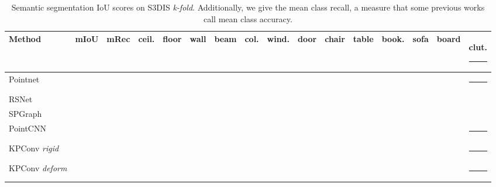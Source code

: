 \documentclass[10pt,twocolumn,letterpaper]{article}
\newcommand\Tstrut{\rule{-3pt}{2.6ex}}       \newcommand\Bstrut{\rule[-0.9ex]{-3pt}{0pt}} \newcommand{\TBstrut}{\rule{-3pt}{2.6ex} \rule[-0.9ex]{-2pt}{0pt}}
\begin{document}
\begin{table*}[t]
\setlength\tabcolsep{0.5pt}
\begin{small}
\begin{center}
\begin{tabular}{L{2.4cm} | C{1.0cm} | C{1.0cm} | *{13}{C{0.9cm}}}
Method	 & mIoU & mRec & ceil.	 & floor	 & wall	 & beam	 & col.	 & wind.	 & door	 & chair	 & table	 & book.	 & sofa	 & board & clut.	\Bstrut\\
\hline
Pointnet \cite{qi2017pointnet}	& 	& 	& 	& 	& 	& 	& 	& 	& 	& 	& 	& 	& 	& 	& 	\Tstrut\\
RSNet \cite{huang2018recurrent}	& 	& 	& 	& 	& 	& 	& 	& 	& 	& 	& 	& 	& 	& 	& 	\\
SPGraph \cite{landrieu2018large}	& 	& 	& 	& 	& 	& 	& 	& 	& 	& 	& 	& 	& 	& 	& 	\\
PointCNN \cite{li2018pointcnn}	& 	& 	& 	& 	& 	& 	& 	& 	& 	& 	& 	& 	& 	& 	& 	\Bstrut\\
\hline
KPConv \textit{rigid}	& 	& 	& 	& 	& 	& 	& 	& 	& 	& 	& 	& 	& 	& 	& 	\Tstrut\\
KPConv \textit{deform}	& 	& 	& 	& 	& 	& 	& 	& 	& 	& 	& 	& 	& 	& 	& 	\Bstrut\\
\hline
\end{tabular}
\end{center}
\end{small}
\caption{Semantic segmentation IoU scores on S3DIS \textit{k-fold}. Additionally, we give the mean class recall, a measure that some previous works call mean class accuracy.}
\label{Table_S3DIS_kfold} 
\end{table*}
\end{document}
